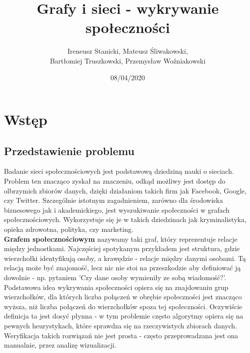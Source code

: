 \documentclass{article}
\title{Grafy i sieci - wykrywanie społeczności}
\date{08/04/2020}
\author{Ireneusz Stanicki, Mateusz Śliwakowski,\\Bartłomiej Truszkowski, Przemysław Woźniakowski}
\begin{document}
	\begin{titlingpage}
		\maketitle
	\end{titlingpage}

\tableofcontents
\newpage

\section{Wstęp}
\subsection{Przedstawienie problemu}
Badanie sieci społecznościowych jest podstawową dziedziną nauki o sieciach. Problem ten znacząco zyskał na znaczeniu, odkąd możliwy jest dostęp do olbrzymich zbiorów danych, dzięki działaniom takich firm jak Facebook, Google, czy Twitter. Szczególnie istotnym zagadnieniem, zarówno dla środowiska biznesowego jak i akademickiego, jest wyszukiwanie społeczności w grafach społecznościowych. Wykorzystuje się je w takich dziedzinach jak kryminalistyka, opieka zdrowotna, polityka, czy marketing\cite{ms-paper1}.\\

\textbf{Grafem społecznościowym} nazywamy taki graf, który reprezentuje relacje między jednostkami. Najczęściej spotykanym przykładem jest struktura, gdzie wierzchołki identyfikują osoby, a krawędzie - relacje między danymi osobami. Tą relacją może być znajomość, lecz nic nie stoi na przeszkodzie aby definiować ją dowolnie - np. pytaniem 'Czy dane osoby wymieniły ze sobą wiadomość?'.\\

Podstawowa idea wykrywania społeczności opiera się na znajdowaniu grup wierzchołków, dla których liczba połączeń w obrębie społeczności jest znacząco wyższa, niż liczba połączeń do wierzchołków spoza tej społeczności. Oczywiście definicja ta jest dosyć płynna - w tym problemie często algorytmy opiera się na pewnych heurystykach, które sprawdza się na rzeczywistych zbiorach danych. Weryfikacja takich rozwiązań nie jest prosta - często przeprowadzana jest ona manualnie, przez analizę wizualizacji. 
\end{document}
